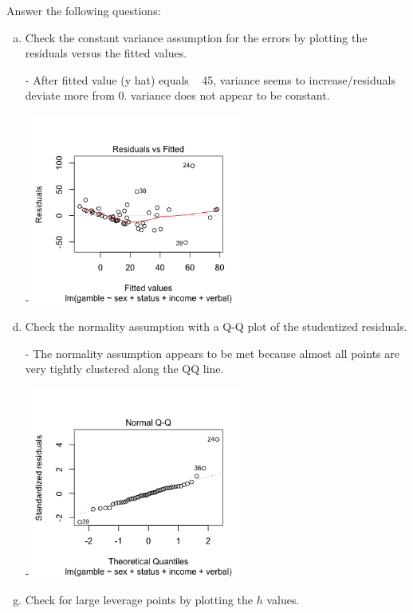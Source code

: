 \documentclass[12pt,letterpaper]{article}
\begin{document}
\vspace{.5cm}
  
\vspace{.5cm}
Answer the following questions:
\vspace{.5cm}
\begin{enumerate}[(a)]
	 \item Check the constant variance assumption for the errors by plotting the residuals versus the fitted values. 
	 
	 \item [-] After fitted value (y hat) equals ~ 45, variance seems to increase/residuals deviate more from 0. variance does not appear to be constant.
	 	\item [-]
	 \includegraphics[width=7cm]{residual.png}
	\item Check the normality assumption with a Q-Q plot of the studentized residuals. 
	
	\item[-] The normality assumption appears to be met because almost all points are very tightly clustered along the QQ line.
		\item [-]
	\includegraphics[width=7cm]{Qqplotps5.png}
	\item Check for large leverage points by plotting the $h$ values.
	

\end{enumerate}
\end{document}
